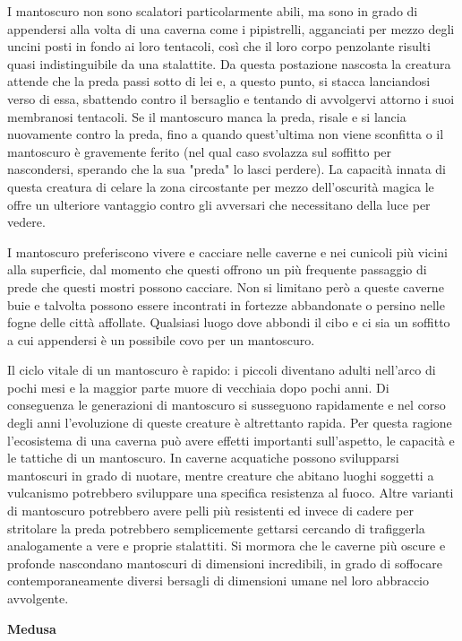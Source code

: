 \begin{multicols}{2}
	I mantoscuro non sono scalatori particolarmente abili, ma sono in grado di appendersi alla volta di una caverna come i pipistrelli, agganciati per mezzo degli uncini posti in fondo ai loro tentacoli, così che il loro corpo penzolante risulti quasi indistinguibile da una stalattite. Da questa postazione nascosta la creatura attende che la preda passi sotto di lei e, a questo punto, si stacca lanciandosi verso di essa, sbattendo contro il bersaglio e tentando di avvolgervi attorno i suoi membranosi tentacoli. Se il mantoscuro manca la preda, risale e si lancia nuovamente contro la preda, fino a quando quest'ultima non viene sconfitta o il mantoscuro è gravemente ferito (nel qual caso svolazza sul soffitto per nascondersi, sperando che la sua "preda" lo lasci perdere). La capacità innata di questa creatura di celare la zona circostante per mezzo dell'oscurità magica le offre un ulteriore vantaggio contro gli avversari che necessitano della luce per vedere.

	I mantoscuro preferiscono vivere e cacciare nelle caverne e nei cunicoli più vicini alla superficie, dal momento che questi offrono un più frequente passaggio di prede che questi mostri possono cacciare. Non si limitano però a queste caverne buie e talvolta possono essere incontrati in fortezze abbandonate o persino nelle fogne delle città affollate. Qualsiasi luogo dove abbondi il cibo e ci sia un soffitto a cui appendersi è un possibile covo per un mantoscuro.

	Il ciclo vitale di un mantoscuro è rapido: i piccoli diventano adulti nell'arco di pochi mesi e la maggior parte muore di vecchiaia dopo pochi anni. Di conseguenza le generazioni di mantoscuro si susseguono rapidamente e nel corso degli anni l'evoluzione di queste creature è altrettanto rapida. Per questa ragione l'ecosistema di una caverna può avere effetti importanti sull'aspetto, le capacità e le tattiche di un mantoscuro. In caverne acquatiche possono svilupparsi mantoscuri in grado di nuotare, mentre creature che abitano luoghi soggetti a vulcanismo potrebbero sviluppare una specifica resistenza al fuoco. Altre varianti di mantoscuro potrebbero avere pelli più resistenti ed invece di cadere per stritolare la preda potrebbero semplicemente gettarsi cercando di trafiggerla analogamente a vere e proprie stalattiti. Si mormora che le caverne più oscure e profonde nascondano mantoscuri di dimensioni incredibili, in grado di soffocare contemporaneamente diversi bersagli di dimensioni umane nel loro abbraccio avvolgente.


	\medskip{}\textbf{Medusa}


\end{multicols}
